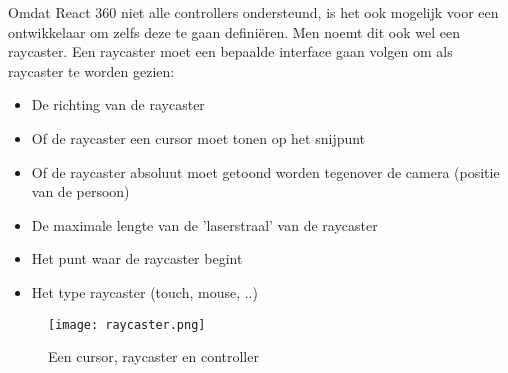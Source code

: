 Omdat React 360 niet alle controllers ondersteund, is het ook mogelijk voor een ontwikkelaar om zelfs deze te gaan definiëren. Men noemt dit ook wel een raycaster. Een raycaster moet een bepaalde interface gaan volgen om als raycaster te worden gezien:

\begin{itemize}
	\item De richting van de raycaster
	\item Of de raycaster een cursor moet tonen op het snijpunt
	\item Of de raycaster absoluut moet getoond worden tegenover de camera (positie van de persoon)
	\item De maximale lengte van de 'laserstraal' van de raycaster
	\item Het punt waar de raycaster begint
	\item Het type raycaster (touch, mouse, ..)
\end{itemize}

\begin{figure}[h]
	\centering
	\texttt{[image: raycaster.png]}
	\caption{Een cursor, raycaster en controller}
	\label{fig:raycaster}
\end{figure}